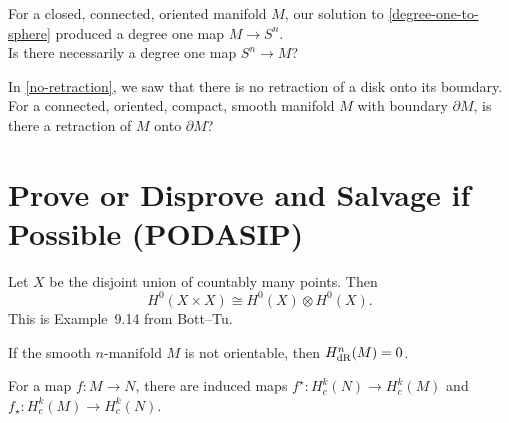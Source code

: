 \documentclass{homework}
\begin{document}
\begin{problem} For a closed, connected, oriented manifold $M$, our
solution to \ref{degree-one-to-sphere} produced a degree one map $M
\to S^n$. \\[1ex]  Is there necessarily a degree one map $S^n \to M$?
\end{problem}

\begin{problem} In \ref{no-retraction}, we saw that there is no
retraction of a disk onto its boundary.  \\[1ex] For a connected,
oriented, compact, smooth manifold $M$ with boundary $\partial M$, is
there a retraction of $M$ onto $\partial M$?
\end{problem}

\section{Prove or Disprove and Salvage if Possible (PODASIP)}

\begin{problem}
  Let $X$ be the disjoint union of countably many points.
  Then
 \[H^0(X \times X) \cong H^0(X) \otimes H^0(X).\]
This is Example~9.14 from Bott--Tu.
\end{problem}

\begin{problem} %
If the smooth $n$-manifold $M$ is not orientable, then $H_{\operatorname{dR}}^n(M) = 0$.
\end{problem}

\begin{problem} For a map $f : M \to N$, there are induced maps
$f^\star : H_c^k(N) \to H_c^k(M)$ and $f_\star : H_c^k(M) \to
H_c^k(N)$.
\end{problem} %
\end{document}

